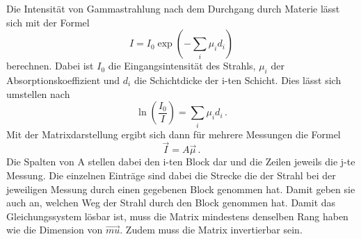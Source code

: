 Die Intensität von Gammastrahlung nach dem Durchgang durch Materie lässt sich mit der Formel
\begin{equation}
    I = I_0 \exp(-\sum_i \mu_i d_i)
\end{equation}
berechnen.
Dabei ist $I_0$ die Eingangsintensität des Strahls, $\mu_i$ der Absorptionskoeffizient und $d_i$ die Schichtdicke der i-ten Schicht.
Dies lässt sich umstellen nach
\begin{equation}
    \ln(\frac{I_0}{I}) = \sum_i \mu_i d_i \,.
\end{equation}
Mit der Matrixdarstellung ergibt sich dann für mehrere Messungen die Formel
\begin{equation}
    \label{eqn:matrixA}
    \vec{I} = A \vec{\mu} \,.
\end{equation}
Die Spalten von A stellen dabei den i-ten Block dar und die Zeilen jeweils die j-te Messung. Die einzelnen Einträge sind dabei die Strecke die der Strahl bei der jeweiligen Messung durch einen gegebenen Block genommen hat. Damit geben sie auch an, welchen Weg der Strahl durch den Block genommen hat.
Damit das Gleichungssystem lösbar ist, muss die Matrix mindestens denselben Rang haben wie die Dimension von $\vec{mu}$. Zudem muss die Matrix invertierbar sein.